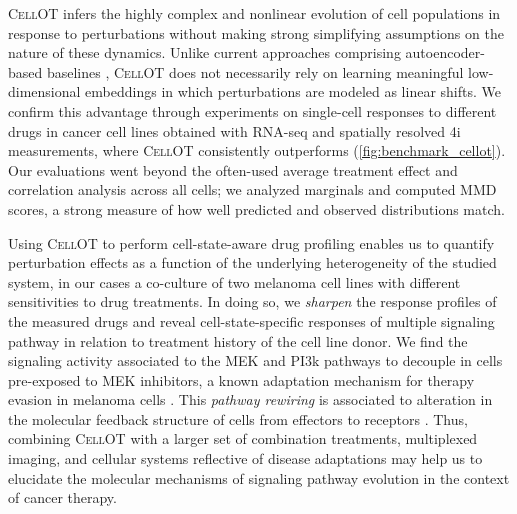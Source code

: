  \textsc{CellOT} infers the highly complex and nonlinear evolution of cell populations in response to perturbations without making strong simplifying assumptions on the nature of these dynamics.
Unlike current approaches comprising autoencoder-based baselines \citep{lopez2018scvi, lotfollahi2019scgen, yang2020predicting}, \textsc{CellOT} does not necessarily rely on learning meaningful low-dimensional embeddings in which perturbations are modeled as linear shifts. %
We confirm this advantage through experiments on single-cell responses to different drugs in cancer cell lines obtained with RNA-seq and spatially resolved 4i measurements, where \textsc{CellOT} consistently outperforms (\cref{fig:benchmark_cellot}). Our evaluations went beyond the often-used average treatment effect and correlation analysis across all cells; we analyzed marginals
and computed MMD scores, a strong measure of how well predicted and observed distributions match.

\smallskip

 Using \textsc{CellOT} to perform cell-state-aware drug profiling enables us to quantify perturbation effects as a function of the underlying heterogeneity of the studied system, in our cases a co-culture of two melanoma cell lines with different sensitivities to drug treatments. In doing so, we \textit{sharpen} the response profiles of the measured drugs and reveal cell-state-specific responses of multiple signaling pathway in relation to treatment history of the cell line donor. We find the signaling activity associated to the MEK and PI3k pathways to decouple in cells pre-exposed to MEK inhibitors, a known adaptation mechanism for therapy evasion in melanoma cells \citep{kun2021mek}. This \textit{pathway rewiring} is associated to alteration in the molecular feedback structure of cells from effectors to receptors \citep{kun2021mek, turke2012mek}. Thus, combining \textsc{CellOT} with a larger set of combination treatments, multiplexed imaging, and cellular systems reflective of disease adaptations may help us to elucidate the molecular mechanisms of signaling pathway evolution in the context of cancer therapy. 

\smallskip

